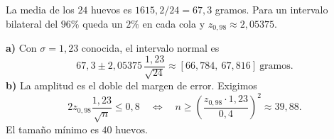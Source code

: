 La media de los $24$ huevos es $1615{,}2/24=67{,}3$ gramos. Para un intervalo bilateral del $96\%$ queda un $2\%$ en cada cola y $z_{0{,}98}\approx2{,}05375$.

\textbf{a)} Con $\sigma=1{,}23$ conocida, el intervalo normal es
\[
67{,}3\pm2{,}05375\,\frac{1{,}23}{\sqrt{24}}
\approx\boxed{[66{,}784,\ 67{,}816]}\ \text{gramos}.
\]
\textbf{b)} La amplitud es el doble del margen de error. Exigimos
\[
2z_{0{,}98}\frac{1{,}23}{\sqrt n}\le0{,}8
\quad\Longleftrightarrow\quad
n\ge\left(\frac{z_{0{,}98}\cdot1{,}23}{0{,}4}\right)^2\approx39{,}88.
\]
El tamaño mínimo es $\boxed{40\text{ huevos}}$.
